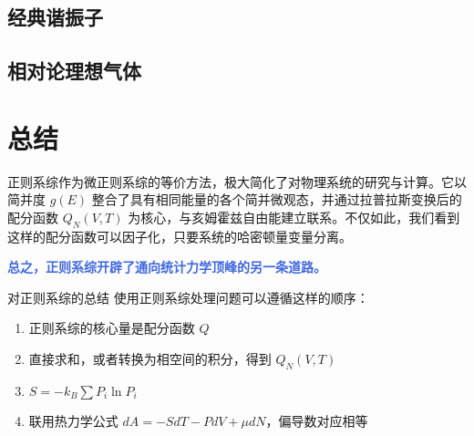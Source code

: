 \subsection{经典谐振子}

\subsection{相对论理想气体}

\section{总结}\label{sec:正则系综总结}

正则系综作为微正则系综的等价方法，极大简化了对物理系统的研究与计算。它以简并度 $g(E)$ 整合了具有相同能量的各个简并微观态，并通过拉普拉斯变换后的配分函数 $Q_N(V,T)$ 为核心，与亥姆霍兹自由能建立联系。不仅如此，我们看到这样的配分函数可以因子化，只要系统的哈密顿量变量分离。

\textcolor{RoyalBlue}{\textbf{\kaishu 总之，正则系综开辟了通向统计力学顶峰的另一条道路。}}

\begin{understanding}{\kaishu 对正则系综的总结}
\kaishu \fontsize{11pt}{16pt}
使用正则系综处理问题可以遵循这样的顺序：
\begin{enumerate}
    \item 正则系综的核心量是配分函数 $Q$
    \item 直接求和，或者转换为相空间的积分，得到 $Q_N(V,T)$
    \item $S = -k_B \sum P_i \ln P_i$
    \item 联用热力学公式 $dA = -SdT - PdV + \mu dN$，偏导数对应相等
\end{enumerate}

\end{understanding}

